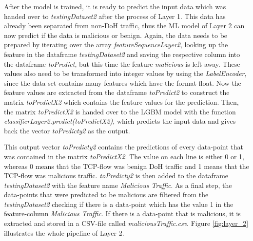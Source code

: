 After the model is trained, it is ready to predict the input data which was handed over to \textit{testingDataset2} after the process of Layer 1. This data has already been separated from non-DoH traffic, thus the ML model of Layer 2 can now predict if the data is malicious or benign. Again, the data needs to be prepared by iterating over the array \textit{featureSequenceLayer2}, looking up the feature in the dataframe \textit{testingDataset2} and saving the respective column into the dataframe \textit{toPredict}, but this time the feature \textit{malicious} is left away. These values also need to be transformed into integer values by using the \textit{LabelEncoder}, since the data-set contains many features which have the format float. Now the feature values are extracted from the dataframe \textit{toPredict2} to construct the matrix \textit{toPredictX2} which contains the feature values for the prediction. Then, the matrix \textit{toPredictX2} is handed over to the LGBM model with the function \textit{classifierLayer2.predict(toPredictX2)}, which predicts the input data and gives back the vector \textit{toPredicty2} as the output. 

This output vector \textit{toPredicty2} contains the predictions of every data-point that was contained in the matrix \textit{toPredictX2}. The value on each line is either 0 or 1, whereas 0 means that the TCP-flow was benign DoH traffic and 1 means that the TCP-flow was malicious traffic. \textit{toPredicty2} is then added to the dataframe \textit{testingDataset2} with the feature name \textit{Malicious Traffic}. As a final step, the data-points that were predicted to be malicious are filtered from the \textit{testingDataset2} checking if there is a data-point which has the value 1 in the feature-column \textit{Malicious Traffic}. If there is a data-point that is malicious, it is extracted and stored in a CSV-file called \textit{maliciousTraffic.csv}. Figure \ref{fig:layer_2} illustrates the whole pipeline of Layer 2.


